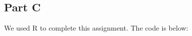 \documentclass[letterpaper, 12pt]{article}
\begin{document}
%



\subsection{Part C}





We used R to complete this assignment.  The code is below:




\end{document}

